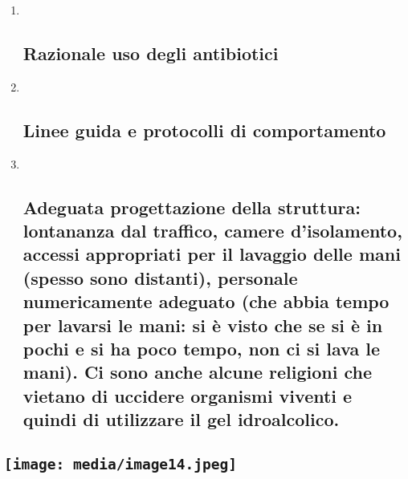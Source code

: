 \documentclass[]{article}
\begin{document}
\begin{enumerate}
\def\labelenumi{\arabic{enumi}.}
\setcounter{enumi}{3}
\item ~
  \subsection{Razionale uso degli
  antibiotici}\label{razionale-uso-degli-antibiotici}
\item ~
  \subsection{\texorpdfstring{\textbf{Linee guida} e \textbf{protocolli
  di
  comportamento}}{Linee guida e protocolli di comportamento}}\label{linee-guida-e-protocolli-di-comportamento}
\item ~
  \subsection{\texorpdfstring{Adeguata \textbf{progettazione della
  struttura}: lontananza dal traffico, camere d'isolamento, accessi
  appropriati per il lavaggio delle mani (spesso sono distanti),
  personale numericamente adeguato (che abbia tempo per lavarsi le mani:
  si è visto che se si è in pochi e si ha poco tempo, non ci si lava le
  mani). Ci sono anche alcune religioni che vietano di uccidere
  organismi viventi e quindi di utilizzare il gel
  idroalcolico.}{Adeguata progettazione della struttura: lontananza dal traffico, camere d'isolamento, accessi appropriati per il lavaggio delle mani (spesso sono distanti), personale numericamente adeguato (che abbia tempo per lavarsi le mani: si è visto che se si è in pochi e si ha poco tempo, non ci si lava le mani). Ci sono anche alcune religioni che vietano di uccidere organismi viventi e quindi di utilizzare il gel idroalcolico.}}\label{adeguata-progettazione-della-struttura-lontananza-dal-traffico-camere-disolamento-accessi-appropriati-per-il-lavaggio-delle-mani-spesso-sono-distanti-personale-numericamente-adeguato-che-abbia-tempo-per-lavarsi-le-mani-si-uxe8-visto-che-se-si-uxe8-in-pochi-e-si-ha-poco-tempo-non-ci-si-lava-le-mani.-ci-sono-anche-alcune-religioni-che-vietano-di-uccidere-organismi-viventi-e-quindi-di-utilizzare-il-gel-idroalcolico.}
\end{enumerate}

\subsection{\texorpdfstring{\protect\texttt{[image: media/image14.jpeg]}}{}}\label{section-6}
\end{document}

